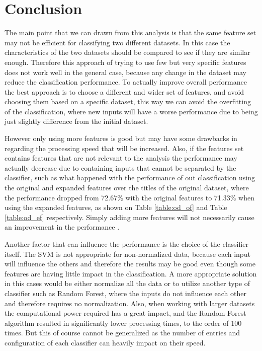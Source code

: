 \documentclass[conference]{IEEEtran}
\begin{document}
\section{Conclusion}

The main point that we can drawn from this analysis is that the same feature set may not be
efficient for classifying two different datasets. In this case the characteristics of the two
datasets should be compared to see if they are similar enough. Therefore this approach of
trying to use few but very specific features does not work well in the general case, because
any change in the dataset may reduce the classification performance. To actually improve overall
performance the best approach is to choose a different and wider set of features, and avoid choosing
them based on a specific dataset, this way we can avoid the overfitting of the classification,
where new inputs will have a worse performance due to being just slightly difference from the
initial dataset.

However only using more features is good but may have some drawbacks in regarding the processing
speed that will be increased. Also, if the features set contains features that are not relevant
to the analysis the performance may actually decrease due to containing inputs that cannot be
separated by the classifier, such as what happened with the performance of out classification using
the original and expanded features over the titles of the original dataset, where the performance
dropped from 72.67\% with the original features to 71.33\% when using the expanded features, as shown
on Table \ref{table:od_of} and Table \ref{table:od_ef} respectively. Simply adding more features
will not necessarily cause an improvement in the performance \cite{volkova_shaffer_jang_hodas_2017}.

Another factor that can influence the performance is the choice of the classifier itself.
The SVM is not appropriate for non-normalized data, because each input will influence the others
and therefore the results may be good even though some features are having little impact in the
classification. A more appropriate solution in this cases would be either normalize all the data
or to utilize another type of classifier such as Random Forest, where the inputs do not influence
each other and therefore requires no normalization. Also, when working with larger datasets the
computational power required has a great impact, and the Random Forest algorithm resulted in
significantly lower processing times, to the order of 100 times. But this of course cannot be
generalized as the number of entries and configuration of each classifier can heavily impact
on their speed.
\end{document}
